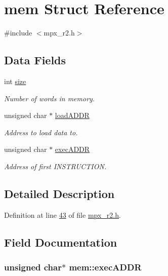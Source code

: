 \hypertarget{structmem}{
\section{mem Struct Reference}
\label{structmem}
}


{\ttfamily \#include $<$mpx\_\-r2.h$>$}

\subsection*{Data Fields}
\begin{DoxyCompactItemize}
\item 
int \hyperlink{structmem_a2f6285207fccce5cfe6a24037bd780c3}{size}
\begin{DoxyCompactList}\small\item\em Number of words in memory. \item\end{DoxyCompactList}\item 
unsigned char $\ast$ \hyperlink{structmem_a8f5a4db03ee0560e6bd4dd602ad753c0}{loadADDR}
\begin{DoxyCompactList}\small\item\em Address to load data to. \item\end{DoxyCompactList}\item 
unsigned char $\ast$ \hyperlink{structmem_a5340491e17307817e6dca3b1d260d18a}{execADDR}
\begin{DoxyCompactList}\small\item\em Address of first INSTRUCTION. \item\end{DoxyCompactList}\end{DoxyCompactItemize}


\subsection{Detailed Description}


Definition at line \hyperlink{mpx__r2_8h_source_l00043}{43} of file \hyperlink{mpx__r2_8h_source}{mpx\_\-r2.h}.



\subsection{Field Documentation}
\hypertarget{structmem_a5340491e17307817e6dca3b1d260d18a}{
\subsubsection[{execADDR}]{\setlength{\rightskip}{0pt plus 5cm}unsigned char$\ast$ {\bf mem::execADDR}}}
\label{structmem_a5340491e17307817e6dca3b1d260d18a}


